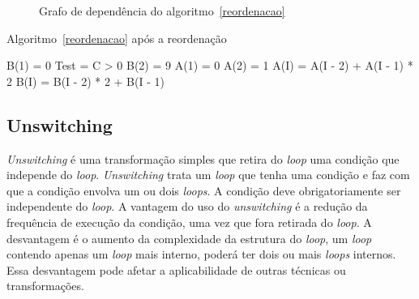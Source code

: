 \begin{figure}
\centering
\label{graph_statement_reordering}
\caption{Grafo de dependência do algoritmo~\ref{reordenacao}}
\end{figure}

\begin{algorithm}
\caption{Algoritmo~\ref{reordenacao} após a reordenação}
\label{reordenado}
\begin{algorithmic}[1]

\STATE B(1) = 0
\STATE Test = C > 0
 \STATE B(2) = 9 \ENDIF
\STATE A(1) = 0
 \STATE A(2) = 1 \ENDIF
{}
\STATE A(I) = A(I - 2) + A(I - 1) * 2
\STATE B(I) = B(I - 2) * 2 + B(I - 1) 
\ENDFOR

\end{algorithmic}
\end{algorithm}


\subsection{Unswitching}

\textit{Unswitching} é uma transformação simples que retira do \textit{loop} 
uma condição que independe do \textit{loop}. 
\textit{Unswitching} trata um \textit{loop} que tenha uma condição e faz com 
que a condição envolva um ou dois \textit{loops}. 
A condição deve obrigatoriamente ser independente do \textit{loop}.
A vantagem do uso do \textit{unswitching} é a redução da frequência de execução da 
condição, uma vez que fora retirada do \textit{loop}. 
A desvantagem é o aumento da complexidade da estrutura do \textit{loop}, 
um \textit{loop} contendo apenas um \textit{loop} mais interno,
poderá ter dois ou mais \textit{loops} internos. 
Essa desvantagem pode afetar a aplicabilidade de outras técnicas ou
transformações.

